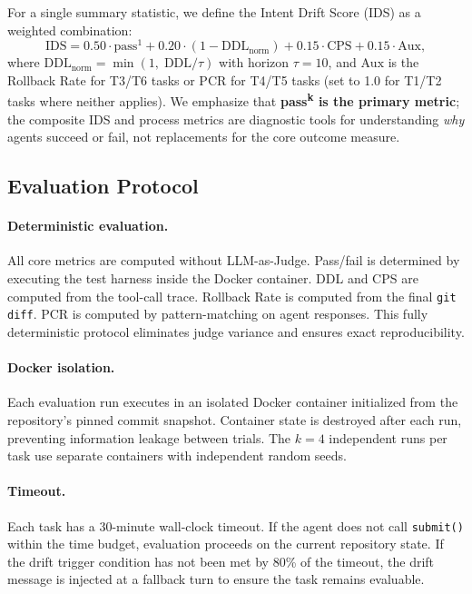 For a single summary statistic, we define the Intent Drift Score (IDS) as a weighted combination:
\begin{equation}
\label{eq:ids}
\text{IDS} = 0.50 \cdot \text{pass}^1 + 0.20 \cdot (1 - \text{DDL}_{\text{norm}}) + 0.15 \cdot \text{CPS} + 0.15 \cdot \text{Aux},
\end{equation}
where $\text{DDL}_{\text{norm}} = \min(1,\; \text{DDL} / \tau)$ with horizon $\tau = 10$, and $\text{Aux}$ is the Rollback Rate for T3/T6 tasks or PCR for T4/T5 tasks (set to 1.0 for T1/T2 tasks where neither applies). We emphasize that \textbf{pass\textsuperscript{k} is the primary metric}; the composite IDS and process metrics are diagnostic tools for understanding \emph{why} agents succeed or fail, not replacements for the core outcome measure.

\subsection{Evaluation Protocol}
\label{sec:eval-protocol}

\paragraph{Deterministic evaluation.}
All core metrics are computed without LLM-as-Judge. Pass/fail is determined by executing the test harness inside the Docker container. DDL and CPS are computed from the tool-call trace. Rollback Rate is computed from the final \texttt{git diff}. PCR is computed by pattern-matching on agent responses. This fully deterministic protocol eliminates judge variance and ensures exact reproducibility.

\paragraph{Docker isolation.}
Each evaluation run executes in an isolated Docker container initialized from the repository's pinned commit snapshot. Container state is destroyed after each run, preventing information leakage between trials. The $k = 4$ independent runs per task use separate containers with independent random seeds.

\paragraph{Timeout.}
Each task has a 30-minute wall-clock timeout. If the agent does not call \texttt{submit()} within the time budget, evaluation proceeds on the current repository state. If the drift trigger condition has not been met by 80\% of the timeout, the drift message is injected at a fallback turn to ensure the task remains evaluable.
